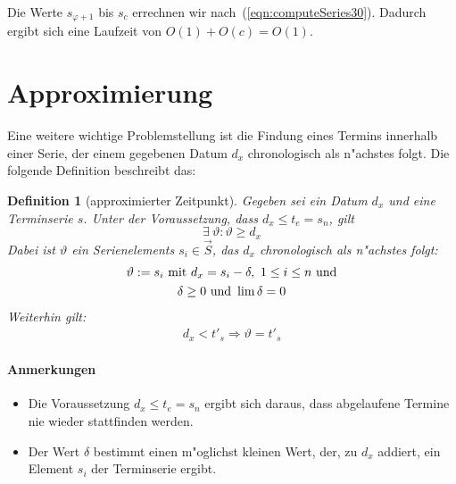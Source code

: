\documentclass[a4paper]{article}
\numberwithin{equation}{section}
\newtheorem{dfn}{Definition}
\begin{document}
\noindent Die Werte $s_{\varphi + 1}$ bis $s_c$ errechnen wir
nach~(\ref{eqn:computeSeries30}). Dadurch ergibt sich eine Laufzeit von
$O(1) + O(c) = O(1)$.



%
%
%
%
\section{Approximierung}
Eine weitere wichtige Problemstellung ist die Findung eines Termins innerhalb
einer Serie, der einem gegebenen Datum $d_x$ chronologisch als n"achstes folgt.
Die folgende Definition beschreibt das:
\begin{dfn}[approximierter Zeitpunkt]\label{def:approx}
  Gegeben sei ein Datum $d_x$ und eine Terminserie $s$. Unter der Voraussetzung,
  dass $d_x \le t_e = s_n$, gilt
  \begin{equation}\exists\ \vartheta : \vartheta \ge d_x\end{equation}
  Dabei ist $\vartheta$ ein Serienelements $s_i \in \vec{S}$, das $d_x$
  chronologisch als n"achstes folgt:
  \begin{gather}\label{eqn:approxGeneral}
    \vartheta := s_i \textnormal{ mit } d_x = s_i - \delta,\ 1 \le i \le n
      \textnormal{ und} \\
    \delta \ge 0 \textnormal{ und } \lim \delta = 0
  \end{gather}
  Weiterhin gilt:
  \begin{eqnarray}\label{eqn:approxEasy}
    d_x < t'_s \Rightarrow \vartheta = t'_s
  \end{eqnarray}
\end{dfn}

\paragraph{Anmerkungen}
\begin{itemize}
\item Die Voraussetzung $d_x \le t_e = s_n$ ergibt sich daraus, dass abgelaufene
  Termine nie wieder stattfinden werden.
\item Der Wert $\delta$ bestimmt einen m"oglichst kleinen Wert, der, zu $d_x$
  addiert, ein Element $s_i$ der Terminserie ergibt.
\end{itemize}
\end{document}
